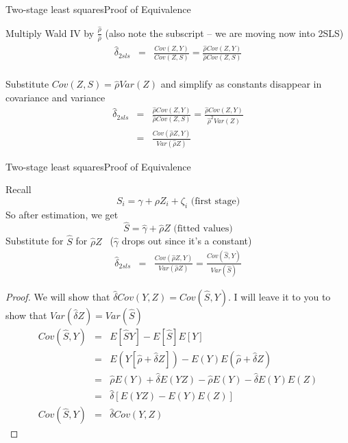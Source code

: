 \documentclass{beamer}
\begin{document}
\begin{frame}{Two-stage least squares}{Proof of Equivalence}

  Multiply Wald IV by $\frac{\widehat{\rho}}{\widehat{\rho}}$  (also note the subscript -- we are moving now into 2SLS)
  \begin{eqnarray*}
    \widehat{\delta}_{2sls} &=& \frac{ Cov(Z,Y)}{ Cov(Z,S)} = \frac{\widehat{\rho}Cov(Z,Y)}{\widehat{\rho}Cov(Z,S)} \\
  \end{eqnarray*}

  Substitute $Cov(Z,S) = \widehat{\rho}Var(Z) $ and simplify as constants disappear in covariance and variance
  \begin{eqnarray*}
    \widehat{\delta}_{2sls} &=& \frac{\widehat{\rho}Cov(Z,Y)}{\widehat{\rho}Cov(Z,S)} = \frac{\widehat{\rho}Cov(Z,Y)}{\widehat{\rho}^2Var(Z)}  \\
    &=&\frac{Cov(\widehat{\rho}Z,Y)}{Var(\widehat{\rho}Z)}
  \end{eqnarray*}

\end{frame}

\begin{frame}{Two-stage least squares}{Proof of Equivalence}

  Recall 
  $$ S_i = \gamma + \rho{Z}_i + \zeta_i \text{ (first stage)} $$
  So after estimation, we get 
  $$\widehat{S}=\widehat{\gamma} + \widehat{\rho}Z \text{ (fitted values)}$$
  Substitute for $\widehat{S}$ for $\widehat{\rho}Z$ \  ($\widehat{\gamma}$ drops out since it's a constant)
  \begin{eqnarray*}
    \widehat{\delta}_{2sls} &=& \frac{Cov(\widehat{\rho}Z,Y)}{Var(\widehat{\rho}Z)} =  \frac{Cov(\widehat{S},Y)}{Var(\widehat{S})}
  \end{eqnarray*}

\end{frame}

\begin{frame}[plain]

  \begin{proof}
    We will show that $\widehat{\delta}Cov(Y,Z) = Cov(\widehat{S},Y)$.  I will leave it to you to show that $Var(\widehat{\delta}Z) = Var(\widehat{S})$
    \begin{eqnarray*}
      Cov(\widehat{S},Y) &=& E[\widehat{S}Y] - E[\widehat{S}]E[Y] \\
      &=& E(Y[\widehat{\rho} + \widehat{\delta}Z]) - E(Y)E(\widehat{\rho} + \widehat{\delta}Z) \\
      &=& \widehat{\rho}E(Y) + \widehat{\delta}E(YZ) - \widehat{\rho}E(Y) - \widehat{\delta}E(Y)E(Z) \\
      &=&\widehat{\delta}[E(YZ) - E(Y)E(Z)] \\
      Cov(\widehat{S},Y) &=& \widehat{\delta}Cov(Y,Z)
    \end{eqnarray*}
    \qedhere
  \end{proof}

\end{frame}
\end{document}
